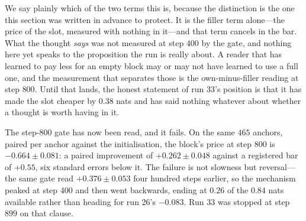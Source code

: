\documentclass{article} %
\begin{document}
We say plainly which of the two terms this is, because the distinction is the one this section was
written in advance to protect. It is the filler term alone---the price of the slot, measured with
nothing in it---and that term cancels in the bar. What the thought \emph{says} was not measured at
step $400$ by the gate, and nothing here yet speaks to the proposition the run is really about.
A reader that has learned to pay less for an empty block may or may not have learned to use a full
one, and the measurement that separates those is the own-minus-filler reading at step $800$. Until
that lands, the honest statement of run 33's position is that it has made the slot cheaper by
$0.38$ nats and has said nothing whatever about whether a thought is worth having in it.


The step-$800$ gate has now been read, and it fails. On the same $465$ anchors, paired per
anchor against the initialisation, the block's price at step $800$ is $-0.664 \pm 0.081$: a
paired improvement of $+0.262 \pm 0.048$ against a registered bar of $+0.55$, six standard
errors below it. The failure is not slowness but reversal---the same gate read $+0.376 \pm
0.053$ four hundred steps earlier, so the mechanism peaked at step $400$ and then went
backwards, ending at $0.26$ of the $0.84$ nats available rather than heading for run 26's
$-0.083$. Run 33 was stopped at step $899$ on that clause.
\end{document}
